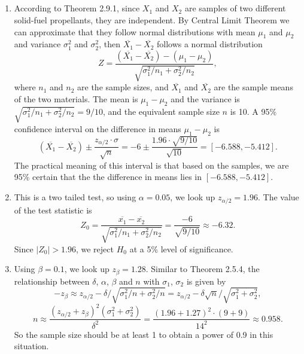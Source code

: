 \documentclass[11pt,a4paper]{article}
\begin{document}
\subsection{}

\begin{enumerate}[label=\roman*)]
\item
According to Theorem 2.9.1, since $X_1$ and $X_2$ are samples of two different solid-fuel propellants, they are independent. By Central Limit Theorem we can approximate that they follow normal distributions with mean $\mu_1$ and $\mu_2$ and variance $\sigma_1^2$ and $\sigma_2^2$, then $\overline{X_1}-\overline{X_2}$ follows a normal distribution
$$Z=\frac{(\overline{X_1}-\overline{X_2})-(\mu_1-\mu_2)}{\sqrt{\sigma_1^2/n_1+\sigma_2^2/n_2}},$$ 
where $n_1$ and $n_2$ are the sample sizes, and $\overline{X_1}$ and $\overline{X_2}$ are the sample means of the two materials. The mean is $\mu_1-\mu_2$ and the variance is $\sqrt{\sigma_1^2/n_1+\sigma_2^2/n_2}=9/10$, and the equivalent sample size $n$ is 10. A 95\% confidence interval on the difference in means $\mu_1-\mu_2$ is
$$(\overline{X_1}-\overline{X_2})\pm\frac{z_{\alpha/2}\cdot \sigma}{\sqrt{n}}=-6\pm\frac{1.96\cdot\sqrt{9/10}}{\sqrt{10}}=[-6.588,-5.412].$$
The practical meaning of this interval is that based on the samples, we are 95\% certain that the the difference in means lies in $[-6.588,-5.412]$.
\item
This is a two tailed test, so using $\alpha=0.05$, we look up $z_{\alpha/2}=1.96$. The value of the test statistic is
$$Z_0=\frac{\overline{x_1}-\overline{x_2}}{\sqrt{\sigma_1^2/n_1+\sigma_2^2/n_2}}=\frac{-6}{\sqrt{9/10}}\approx-6.32.$$
Since $|Z_0|>1.96$, we reject $H_0$ at a 5\% level of significance.
\item
Using $\beta=0.1$, we look up $z_\beta=1.28$. Similar to Theorem 2.5.4, the relationship between $\delta$, $\alpha$, $\beta$ and $n$ with $\sigma_1$, $\sigma_2$ is given by
$$-z_\beta\approx z_{\alpha/2}-\delta/\sqrt{\sigma_1^2/n+\sigma_2^2/n}=z_{\alpha/2}-\delta\sqrt{n}/\sqrt{\sigma_1^2+\sigma_2^2},$$
$$n\approx\frac{(z_{\alpha/2}+z_\beta)^2(\sigma_1^2+\sigma_2^2)}{\delta^2}=\frac{(1.96+1.27)^2\cdot(9+9)}{14^2}\approx0.958.$$
So the sample size should be at least 1 to obtain a power of 0.9 in this situation.
\end{enumerate}
\end{document}
